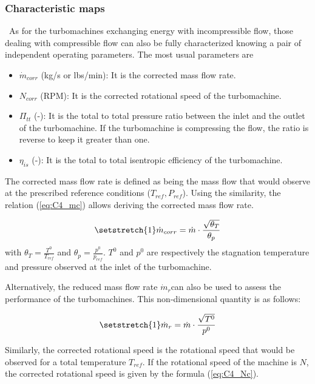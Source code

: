 \subsubsection{Characteristic maps}
\quad\ As for the turbomachines exchanging energy with incompressible flow, those dealing with compressible flow can also be fully characterized knowing a pair of independent operating parameters. The most usual parameters are

\begin{itemize}
    \item \(\dot{m}_{corr}\) (kg/s or lbs/min): It is the corrected mass flow rate.

    \item \(N_{corr}\) (RPM): It is the corrected rotational speed of the turbomachine.

    \item \(\Pi_{tt}\) (-): It is the total to total pressure ratio between the inlet and the outlet of the turbomachine. If the turbomachine is compressing the flow, the ratio is reverse to keep it greater than one.

    \item \(\eta_{is}\) (-): It is the total to total isentropic efficiency of the turbomachine.
\end{itemize}
The corrected mass flow rate is defined as being the mass flow that would observe at the prescribed reference conditions ($T_{ref},P_{ref}$). Using the similarity, the relation (\ref{eq:C4_mc}) allows deriving the corrected mass flow rate.

\begin{equation}
\setstretch{1}
    \dot{m}_{corr} = \dot{m}\cdot \frac{\sqrt{\theta_T}}{\theta_p}\label{eq:C4_mc}
\end{equation}
with $\theta_T = \frac{T^0}{T_{ref}}$ and $\theta_p = \frac{p^0}{p_{ref}}$. $T^0$ and $p^0$ are respectively the stagnation temperature and pressure observed at the inlet of the turbomachine.

Alternatively, the reduced mass flow rate \(\dot{m}_{r}\)can also be used to assess the performance of the turbomachines. This non-dimensional quantity is as follows:

\begin{equation}
    \setstretch{1}
    \dot{m}_r = \dot{m}\cdot \frac{\sqrt{T^0}}{p^0}
\end{equation}

Similarly, the corrected rotational speed is the rotational speed that would be observed for a total temperature $T_{ref}$. If the rotational speed of the machine is $N$, the corrected rotational speed is given by the formula (\ref{eq:C4_Nc}).

